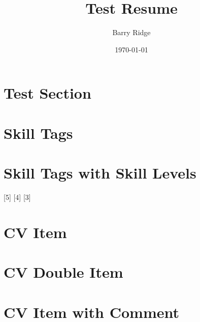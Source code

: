 \documentclass[11pt,letterpaper,sans]{moderncv}
\author{Barry Ridge}
\date{\today}
\title{Test Resume}
\begin{document}
\section{Test Section}
\label{sec:orgdc70718}

\section{Skill Tags}
\label{sec:org4123a30}
  

\section{Skill Tags with Skill Levels}
\label{sec:org05c5694}
[5] [4] [3]

\section{CV Item}
\label{sec:orgb797d51}

\section{CV Double Item}
\label{sec:orgfe267d8}

\section{CV Item with Comment}
\label{sec:org9a33633}
\end{document}
